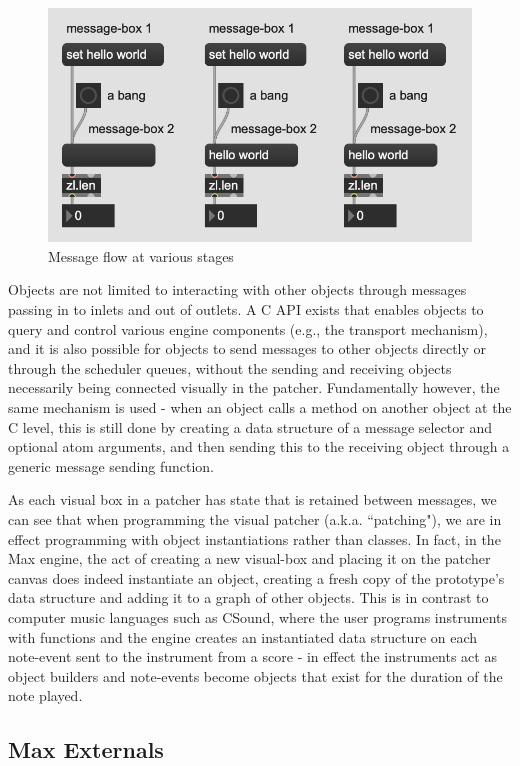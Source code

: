 \documentclass[acmsmall]{acmart}
\begin{document}
\begin{figure}[H]
  \centering
  \includegraphics[width=.5\linewidth]{fig-2}
  \caption{Message flow at various stages}
\end{figure}

Objects are not limited to interacting with other objects through messages passing in to inlets and out of 
outlets. A C API exists that enables objects to query and control various engine components (e.g., 
the transport mechanism), and it is also possible for objects to send messages to other objects 
directly or through the scheduler queues, without the sending and receiving objects 
necessarily being connected visually in the patcher. Fundamentally however, the same mechanism
is used - when an object calls a method on another object at the C level, this is still done
by creating a data structure of a message selector and optional atom arguments, 
and then sending this to the receiving object through a generic message sending function.

As each visual box in a patcher has state that is retained between messages, we can see that when
programming the visual patcher (a.k.a. ``patching"), we are in effect programming with
object instantiations rather than classes. In fact, in the Max engine, the act of creating
a new visual-box and placing it on the patcher canvas does indeed instantiate an object, creating
a fresh copy of the prototype's data structure and adding it to a graph of other objects.
This is in contrast to computer music languages such as CSound, where the user programs instruments 
with functions and the engine creates an instantiated data structure on each note-event sent to 
the instrument from a score - in effect the instruments act as object builders and note-events 
become objects that exist for the duration of the note played.



\subsection{Max Externals}
\end{document}
